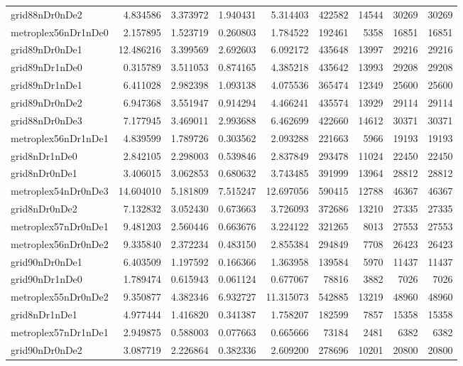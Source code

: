 \documentclass[../../../thesis.tex]{subfiles}
\begin{document}
\begin{longtable}{|l|r|r|r|r|r|r|r|r|}
grid88nDr0nDe2 & 4.834586 & 3.373972 & 1.940431 & 5.314403 & 422582 & 14544 & 30269 & 30269 \\
metroplex56nDr1nDe0 & 2.157895 & 1.523719 & 0.260803 & 1.784522 & 192461 & 5358 & 16851 & 16851 \\
grid89nDr0nDe1 & 12.486216 & 3.399569 & 2.692603 & 6.092172 & 435648 & 13997 & 29216 & 29216 \\
grid89nDr1nDe0 & 0.315789 & 3.511053 & 0.874165 & 4.385218 & 435642 & 13993 & 29208 & 29208 \\
grid89nDr1nDe1 & 6.411028 & 2.982398 & 1.093138 & 4.075536 & 365474 & 12349 & 25600 & 25600 \\
grid89nDr0nDe2 & 6.947368 & 3.551947 & 0.914294 & 4.466241 & 435574 & 13929 & 29114 & 29114 \\
grid88nDr0nDe3 & 7.177945 & 3.469011 & 2.993688 & 6.462699 & 422660 & 14612 & 30371 & 30371 \\
metroplex56nDr1nDe1 & 4.839599 & 1.789726 & 0.303562 & 2.093288 & 221663 & 5966 & 19193 & 19193 \\
grid8nDr1nDe0 & 2.842105 & 2.298003 & 0.539846 & 2.837849 & 293478 & 11024 & 22450 & 22450 \\
grid8nDr0nDe1 & 3.406015 & 3.062853 & 0.680632 & 3.743485 & 391999 & 13964 & 28812 & 28812 \\
metroplex54nDr0nDe3 & 14.604010 & 5.181809 & 7.515247 & 12.697056 & 590415 & 12788 & 46367 & 46367 \\
grid8nDr0nDe2 & 7.132832 & 3.052430 & 0.673663 & 3.726093 & 372686 & 13210 & 27335 & 27335 \\
metroplex57nDr0nDe1 & 9.481203 & 2.560446 & 0.663676 & 3.224122 & 321265 & 8013 & 27553 & 27553 \\
metroplex56nDr0nDe2 & 9.335840 & 2.372234 & 0.483150 & 2.855384 & 294849 & 7708 & 26423 & 26423 \\
grid90nDr0nDe1 & 6.403509 & 1.197592 & 0.166366 & 1.363958 & 139584 & 5970 & 11437 & 11437 \\
grid90nDr1nDe0 & 1.789474 & 0.615943 & 0.061124 & 0.677067 & 78816 & 3882 & 7026 & 7026 \\
metroplex55nDr0nDe2 & 9.350877 & 4.382346 & 6.932727 & 11.315073 & 542885 & 13219 & 48960 & 48960 \\
grid8nDr1nDe1 & 4.977444 & 1.416820 & 0.341387 & 1.758207 & 182599 & 7857 & 15358 & 15358 \\
metroplex57nDr1nDe1 & 2.949875 & 0.588003 & 0.077663 & 0.665666 & 73184 & 2481 & 6382 & 6382 \\
grid90nDr0nDe2 & 3.087719 & 2.226864 & 0.382336 & 2.609200 & 278696 & 10201 & 20800 & 20800 \\

\end{longtable}
\end{document}
